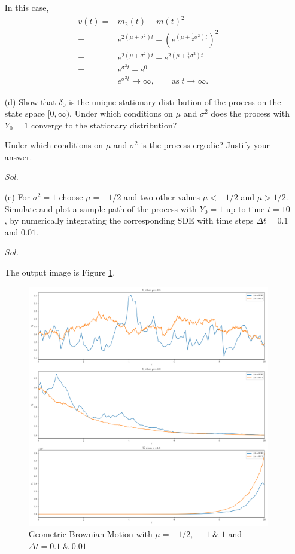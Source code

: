 \begin{enumerate}
        In this case,
        \begin{align*}
            v(t) = & m_2(t) - m(t)^2 \\ 
            = & e^{2(\mu + \sigma^2)t} - \left( e^{(\mu+ \frac{1}{2} \sigma^2) t} \right)^2 \\ 
            = & e^{2(\mu + \sigma^2)t} - e^{2( \mu + \frac{1}{2}\sigma^2)t} \\ 
            = & e^{\sigma^2 t} - e^{0} \\ 
            = & e^{\sigma^2 t} \to \infty, \qquad \text{as} \; t \to \infty.
        \end{align*}

    \item[(d)] Show that $\delta_0$ is the unique stationary distribution of the process on the state space $[0, \infty)$. Under which conditions on $\mu$ and $\sigma^2$ does the process with $Y_0 = 1$ converge to the stationary distribution?
    
    Under which conditions on $\mu$ and $\sigma^2$ is the process ergodic? Justify your answer.

        \textit{ Sol. } 

    \item[(e)] For $\sigma^2 = 1$ choose $\mu = -1/2$ and two other values $\mu < -1/2$ and $\mu > 1/2$. Simulate and plot a sample path of the process with $Y_0 = 1$ up to time $t = 10$, by numerically integrating the corresponding SDE with time steps $\Delta t = 0.1$ and $0.01$.
    
        \textit{ Sol. }
        
        The output image is Figure \ref{fig1}.
        \begin{figure}[!htbp]
            \includegraphics[width=18cm]{./Programming/Q3-1-D.png}
            \caption{Geometric Brownian Motion with $\mu = -1/2, \, -1 \; \& \; 1$ and $\Delta t = 0.1 \; \& \; 0.01$}
            \label{fig1}
        \end{figure}

\end{enumerate}

\newpage